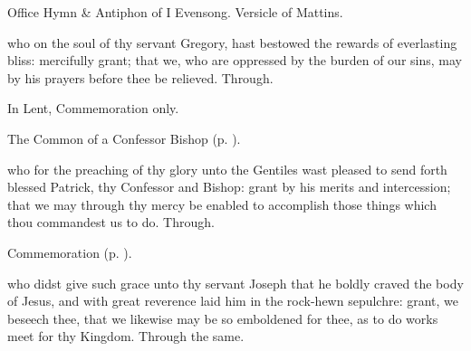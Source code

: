 \secondEvensong

\begin{rubric}
	Office Hymn \& Antiphon of I Evensong. Versicle of Mattins.
\end{rubric}

\collect
{} who on the soul of thy servant Gregory, hast bestowed the rewards of everlasting bliss: mercifully grant; that we, who are oppressed by the burden of our sins, may by his prayers before thee be relieved. Through.



\begin{rubric}
	In Lent, Commemoration only.
\end{rubric}

\begin{rubric}
	The Common of a Confessor Bishop (p. \pageref{CommonConfessorBishop}).
\end{rubric}

 who for the preaching of thy glory unto the Gentiles wast pleased to send forth blessed Patrick, thy Confessor and Bishop: grant by his merits and intercession; that we may through thy mercy be enabled to accomplish those things which thou commandest us to do. Through.

\begin{rubric}
    Commemoration  (p. \pageref{ArimatheanCollect}).
\end{rubric}




\memorialCollect\label{ArimatheanCollect}
 who didst give such grace unto thy servant Joseph that he boldly craved the body of Jesus, and with great reverence laid him in the rock-hewn sepulchre: grant, we beseech thee, that we likewise may be so emboldened for thee, as to do works meet for thy Kingdom. Through the same.



